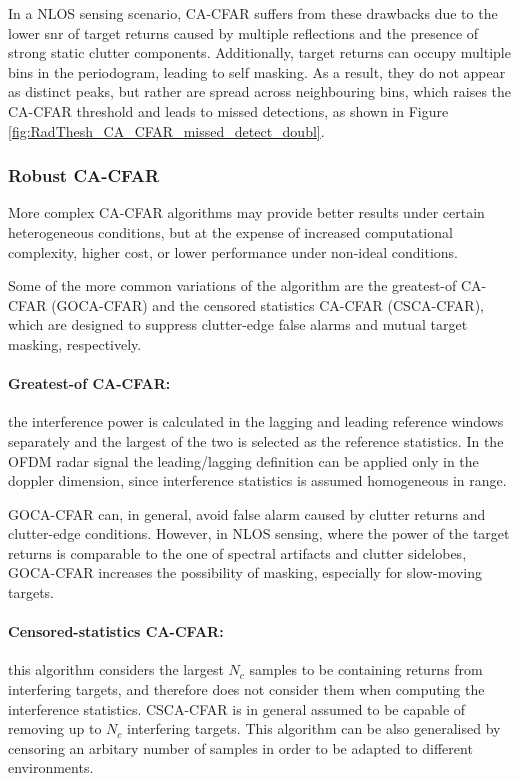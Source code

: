 	In a NLOS sensing scenario, CA-CFAR suffers from these drawbacks due to the lower \gls{snr} of target returns caused by multiple reflections and the presence of strong static clutter components.
	Additionally, target returns can occupy multiple bins in the periodogram, leading to self masking. 
	As a result, they do not appear as distinct peaks, but rather are spread across neighbouring bins, which raises the CA-CFAR threshold and leads to missed detections, as shown in Figure \ref{fig:RadThesh_CA_CFAR_missed_detect_doubl}.

\subsubsection{Robust CA-CFAR}
More complex CA-CFAR algorithms may provide better results under certain heterogeneous conditions, but at the expense of increased computational complexity, higher cost, or lower performance under non-ideal conditions.

Some of the more common variations of the algorithm are the greatest-of CA-CFAR (GOCA-CFAR) and the censored statistics CA-CFAR (CSCA-CFAR), which are designed to suppress clutter-edge false alarms and mutual target masking, respectively.

\paragraph{Greatest-of CA-CFAR:}
the interference power is calculated in the lagging and leading reference windows separately and the largest of the two is selected as the reference statistics. In the OFDM radar signal the leading/lagging definition can be applied only in the doppler dimension, since interference statistics is assumed homogeneous in range.

GOCA-CFAR can, in general, avoid false alarm caused by clutter returns and clutter-edge conditions. However, in NLOS sensing, where the power of the target returns is comparable to the one of spectral artifacts and clutter sidelobes, GOCA-CFAR increases the possibility of masking, especially for slow-moving targets.
 
 
\paragraph{Censored-statistics CA-CFAR:}
this algorithm considers the largest $N_c$ samples to be containing returns from interfering targets, and therefore does not consider them when computing the interference statistics. CSCA-CFAR is in general assumed to be capable of removing up to $N_c$ interfering targets.
This algorithm can be also generalised by censoring an arbitary number of samples in order to be adapted to different environments. 

